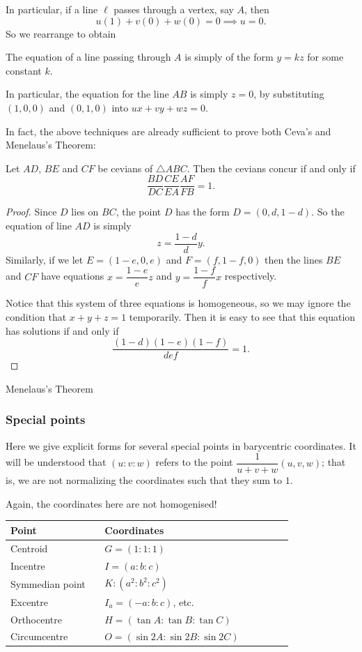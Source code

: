In particular, if a line $\ell$ passes through a vertex, say $A$, then
\[u(1)+v(0)+w(0)=0\implies u=0.\]
So we rearrange to obtain

\begin{corollary}
The equation of a line passing through $A$ is simply of the
form $y=kz$ for some constant $k$.
\end{corollary}

In particular, the equation for the line $AB$ is simply $z=0$, by substituting $(1,0,0)$ and $(0,1,0)$ into $ux+vy+wz=0$.

In fact, the above techniques are already sufficient to prove both Ceva's and Menelaus's Theorem:

\begin{theorem}
Let $AD$, $BE$ and $CF$ be cevians of $\triangle ABC$. Then the cevians concur if and only if
\[\frac{BD}{DC}\frac{CE}{EA}\frac{AF}{FB}=1.\]
\end{theorem}

\begin{proof}
Since $D$ lies on $BC$, the point $D$ has the form $D=(0,d,1-d)$. So the equation of line $AD$ is simply
\[z=\frac{1-d}{d}y.\]
Similarly, if we let $E=(1-e,0,e)$ and $F=(f,1-f,0)$ then the lines $BE$ and $CF$ have equations $x=\dfrac{1-e}{e}z$ and $y=\dfrac{1-f}{f}x$ respectively.

Notice that this system of three equations is homogeneous, so we may ignore the condition that $x+y+z=1$ temporarily. Then it is easy to see that this equation has solutions if and only if
\[\frac{(1-d)(1-e)(1-f)}{def}=1.\]
\end{proof}

Menelaus’s Theorem

\subsubsection{Special points}
Here we give explicit forms for several special points in barycentric coordinates. It will be understood that $(u:v:w)$ refers to the point $\dfrac{1}{u+v+w}(u,v,w)$; that is, we are not normalizing the coordinates such that they sum to $1$.

Again, the coordinates here are not homogenised!

\begin{table}[H]
\centering
\begin{tabular}{p{0.3\linewidth}p{0.6\linewidth}}
\hline\hline
\textbf{Point} & \textbf{Coordinates} \\
\hline
Centroid & $G=(1:1:1)$ \\
Incentre & $I=(a:b:c)$ \\
Symmedian point & $K:(a^2:b^2:c^2)$ \\
Excentre & $I_a=(-a:b:c)$, etc. \\
Orthocentre & $H=(\tan A:\tan B:\tan C)$ \\
Circumcentre & $O=(\sin2A:\sin2B:\sin2C)$ \\
\hline\hline
\end{tabular}
\end{table}

